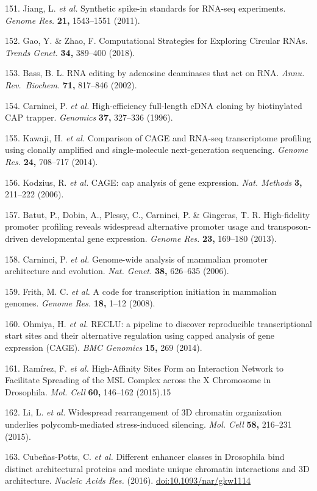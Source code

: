 \documentclass[11pt,twoside]{MPIthesis}
\theoremstyle{definition}
\theoremstyle{definition}
\theoremstyle{definition}
\theoremstyle{remark}
\begin{document}
151. Jiang, L. \emph{et al.} Synthetic spike-in standards for RNA-seq
experiments. \emph{Genome Res.} \textbf{21,} 1543--1551 (2011).

152. Gao, Y. \& Zhao, F. Computational Strategies for Exploring Circular
RNAs. \emph{Trends Genet.} \textbf{34,} 389--400 (2018).

153. Bass, B. L. RNA editing by adenosine deaminases that act on RNA.
\emph{Annu. Rev.~Biochem.} \textbf{71,} 817--846 (2002).

154. Carninci, P. \emph{et al.} High-efficiency full-length cDNA cloning
by biotinylated CAP trapper. \emph{Genomics} \textbf{37,} 327--336
(1996).

155. Kawaji, H. \emph{et al.} Comparison of CAGE and RNA-seq
transcriptome profiling using clonally amplified and single-molecule
next-generation sequencing. \emph{Genome Res.} \textbf{24,} 708--717
(2014).

156. Kodzius, R. \emph{et al.} CAGE: cap analysis of gene expression.
\emph{Nat. Methods} \textbf{3,} 211--222 (2006).

157. Batut, P., Dobin, A., Plessy, C., Carninci, P. \& Gingeras, T. R.
High-fidelity promoter profiling reveals widespread alternative promoter
usage and transposon-driven developmental gene expression. \emph{Genome
Res.} \textbf{23,} 169--180 (2013).

158. Carninci, P. \emph{et al.} Genome-wide analysis of mammalian
promoter architecture and evolution. \emph{Nat. Genet.} \textbf{38,}
626--635 (2006).

159. Frith, M. C. \emph{et al.} A code for transcription initiation in
mammalian genomes. \emph{Genome Res.} \textbf{18,} 1--12 (2008).

160. Ohmiya, H. \emph{et al.} RECLU: a pipeline to discover reproducible
transcriptional start sites and their alternative regulation using
capped analysis of gene expression (CAGE). \emph{BMC Genomics}
\textbf{15,} 269 (2014).

161. Ramírez, F. \emph{et al.} High-Affinity Sites Form an Interaction
Network to Facilitate Spreading of the MSL Complex across the X
Chromosome in Drosophila. \emph{Mol. Cell} \textbf{60,} 146--162
(2015).15

162. Li, L. \emph{et al.} Widespread rearrangement of 3D chromatin
organization underlies polycomb-mediated stress-induced silencing.
\emph{Mol. Cell} \textbf{58,} 216--231 (2015).

163. Cubeñas-Potts, C. \emph{et al.} Different enhancer classes in
Drosophila bind distinct architectural proteins and mediate unique
chromatin interactions and 3D architecture. \emph{Nucleic Acids Res.}
(2016). \url{doi:10.1093/nar/gkw1114}
\end{document}
